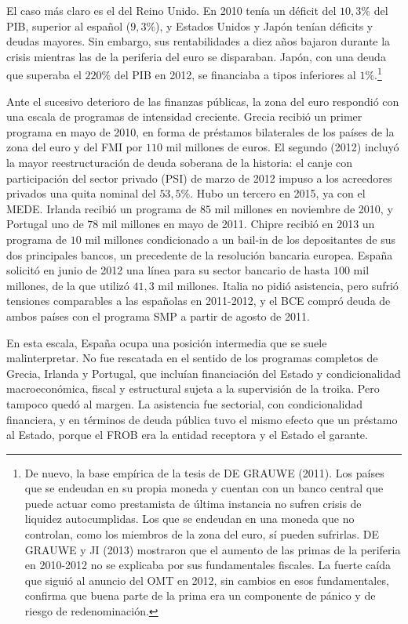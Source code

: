 \documentclass[10pt,a4paper]{article}
\begin{document}
El caso más claro es el del Reino Unido. En 2010 tenía un déficit del $10,3\%$ del PIB, superior al español ($9,3\%$), y Estados Unidos y Japón tenían déficits y deudas mayores. Sin embargo, sus rentabilidades a diez años bajaron durante la crisis mientras las de la periferia del euro se disparaban. Japón, con una deuda que superaba el $220\%$ del PIB en 2012, se financiaba a tipos inferiores al $1\%$.\footnote{
De nuevo, la base empírica de la tesis de DE GRAUWE (2011). Los países que se endeudan en su propia moneda y cuentan con un banco central que puede actuar como prestamista de última instancia no sufren crisis de liquidez autocumplidas. Los que se endeudan en una moneda que no controlan, como los miembros de la zona del euro, sí pueden sufrirlas. DE GRAUWE y JI (2013) mostraron que el aumento de las primas de la periferia en 2010-2012 no se explicaba por sus fundamentales fiscales. La fuerte caída que siguió al anuncio del OMT en 2012, sin cambios en esos fundamentales, confirma que buena parte de la prima era un componente de pánico y de riesgo de redenominación.
}

Ante el sucesivo deterioro de las finanzas públicas, la zona del euro respondió con una escala de programas de intensidad creciente. Grecia recibió un primer programa en mayo de 2010, en forma de préstamos bilaterales de los países de la zona del euro y del FMI por $110$ mil millones de euros. El segundo (2012) incluyó la mayor reestructuración de deuda soberana de la historia: el canje con participación del sector privado (PSI) de marzo de 2012 impuso a los acreedores privados una quita nominal del $53,5\%$. Hubo un tercero en 2015, ya con el MEDE. Irlanda recibió un programa de $85$ mil millones en noviembre de 2010, y Portugal uno de $78$ mil millones en mayo de 2011. Chipre recibió en 2013 un programa de $10$ mil millones condicionado a un bail-in de los depositantes de sus dos principales bancos, un precedente de la resolución bancaria europea. España solicitó en junio de 2012 una línea para su sector bancario de hasta $100$ mil millones, de la que utilizó $41,3$ mil millones. Italia no pidió asistencia, pero sufrió tensiones comparables a las españolas en 2011-2012, y el BCE compró deuda de ambos países con el programa SMP a partir de agosto de 2011.

En esta escala, España ocupa una posición intermedia que se suele malinterpretar. No fue rescatada en el sentido de los programas completos de Grecia, Irlanda y Portugal, que incluían financiación del Estado y condicionalidad macroeconómica, fiscal y estructural sujeta a la supervisión de la troika. Pero tampoco quedó al margen. La asistencia fue sectorial, con condicionalidad financiera, y en términos de deuda pública tuvo el mismo efecto que un préstamo al Estado, porque el FROB era la entidad receptora y el Estado el garante.
\end{document}
